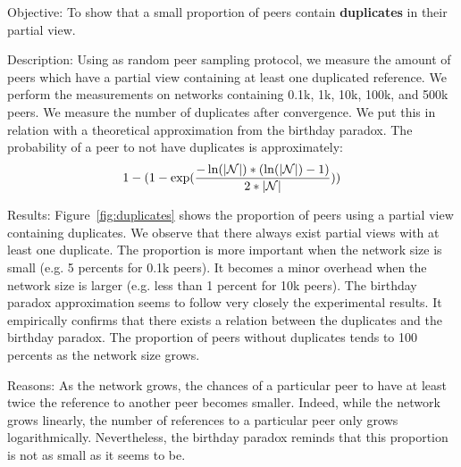 \begin{asparadesc} 
\item[Objective:] To show that a small proportion of peers contain
  \textbf{duplicates} in their partial view.
\item[Description:] Using \SCAMP as random peer sampling protocol, we measure
  the amount of peers which have a partial view containing at least one
  duplicated reference. We perform the measurements on networks containing
  0.1k, 1k, 10k, 100k, and 500k peers. We measure the number of duplicates
  after convergence. We put this in relation with a theoretical approximation
  from the birthday paradox. The probability of a peer to not have duplicates
  is approximately:
  \begin{equation}
    1- 
    (1-
    \exp({-\ln(|\mathcal{N}|)*(\ln(|\mathcal{N}|)-1)\over{2*|\mathcal{N}|}}))
  \end{equation}
\item[Results:] Figure~\ref{fig:duplicates} shows the proportion of peers using
  a partial view containing duplicates. We observe that there always exist
  partial views with at least one duplicate. The proportion is more important
  when the network size is small (e.g. 5 percents for 0.1k peers). It becomes a
  minor overhead when the network size is larger (e.g. less than 1 percent for
  10k peers). The birthday paradox approximation seems to follow very closely
  the experimental results. It empirically confirms that there exists a relation
  between the duplicates and the birthday paradox. The proportion of peers
  without duplicates tends to 100 percents as the network size grows.
\item[Reasons:] As the network grows, the chances of a particular peer to have
  at least twice the reference to another peer becomes smaller. Indeed, while
  the network grows linearly, the number of references to a particular peer
  only grows logarithmically. Nevertheless, the birthday paradox reminds that
  this proportion is not as small as it seems to be.
\end{asparadesc}


